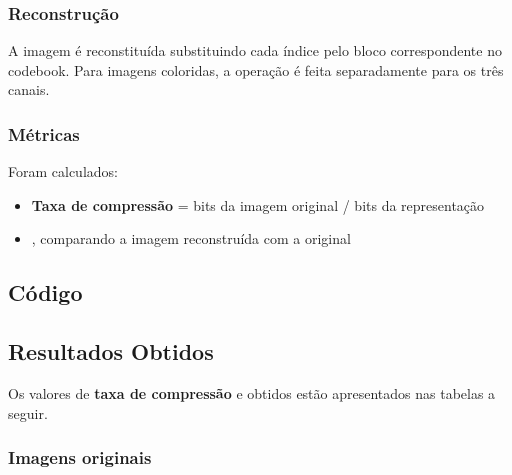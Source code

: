 \documentclass[../main.tex]{subfiles}
\begin{document}
\subsubsection{Reconstrução}
A imagem é reconstituída substituindo cada índice pelo bloco correspondente no codebook. Para imagens coloridas, a operação é feita separadamente para os três canais.

\subsubsection{Métricas}
Foram calculados:
\begin{itemize}
    \item \textbf{Taxa de compressão} = bits da imagem original / bits da representação \vq{}
    \item \textbf{\psnr{}}, comparando a imagem reconstruída com a original
\end{itemize}

\subsection{Código}






\subsection{Resultados Obtidos}
Os valores de \textbf{taxa de compressão} e \textbf{\psnr{}} obtidos estão apresentados nas tabelas a seguir.

\subsubsection{Imagens originais}

\end{document}
